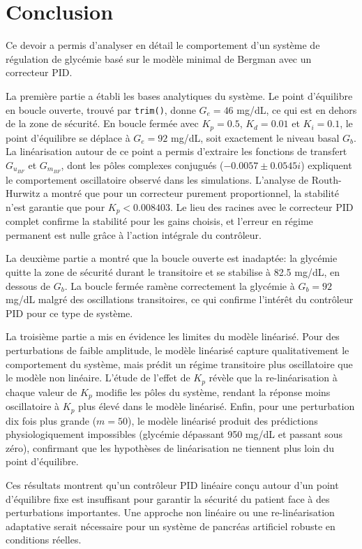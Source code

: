 \section*{Conclusion}

Ce devoir a permis d'analyser en détail le comportement d'un système de régulation de glycémie basé sur le modèle minimal de Bergman avec un correcteur PID.

La première partie a établi les bases analytiques du système. Le point d'équilibre en boucle ouverte, trouvé par \texttt{trim()}, donne $G_e = 46$ mg/dL, ce qui est en dehors de la zone de sécurité. En boucle fermée avec $K_p = 0.5$, $K_d = 0.01$ et $K_i = 0.1$, le point d'équilibre se déplace à $G_e = 92$ mg/dL, soit exactement le niveau basal $G_b$. La linéarisation autour de ce point a permis d'extraire les fonctions de transfert $G_{u_{BF}}$ et $G_{m_{BF}}$, dont les pôles complexes conjugués ($-0.0057 \pm 0.0545i$) expliquent le comportement oscillatoire observé dans les simulations. L'analyse de Routh-Hurwitz a montré que pour un correcteur purement proportionnel, la stabilité n'est garantie que pour $K_p < 0.008403$. Le lieu des racines avec le correcteur PID complet confirme la stabilité pour les gains choisis, et l'erreur en régime permanent est nulle grâce à l'action intégrale du contrôleur.

La deuxième partie a montré que la boucle ouverte est inadaptée: la glycémie quitte la zone de sécurité durant le transitoire et se stabilise à 82.5 mg/dL, en dessous de $G_b$. La boucle fermée ramène correctement la glycémie à $G_b = 92$ mg/dL malgré des oscillations transitoires, ce qui confirme l'intérêt du contrôleur PID pour ce type de système.

La troisième partie a mis en évidence les limites du modèle linéarisé. Pour des perturbations de faible amplitude, le modèle linéarisé capture qualitativement le comportement du système, mais prédit un régime transitoire plus oscillatoire que le modèle non linéaire. L'étude de l'effet de $K_p$ révèle que la re-linéarisation à chaque valeur de $K_p$ modifie les pôles du système, rendant la réponse moins oscillatoire à $K_p$ plus élevé dans le modèle linéarisé. Enfin, pour une perturbation dix fois plus grande ($m = 50$), le modèle linéarisé produit des prédictions physiologiquement impossibles (glycémie dépassant 950 mg/dL et passant sous zéro), confirmant que les hypothèses de linéarisation ne tiennent plus loin du point d'équilibre.

Ces résultats montrent qu'un contrôleur PID linéaire conçu autour d'un point d'équilibre fixe est insuffisant pour garantir la sécurité du patient face à des perturbations importantes. Une approche non linéaire ou une re-linéarisation adaptative serait nécessaire pour un système de pancréas artificiel robuste en conditions réelles.
